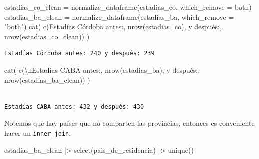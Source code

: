\documentclass[
  spanish,
  letterpaper,
  DIV=11,
  numbers=noendperiod]{scrartcl}
\newenvironment{Shaded}{\begin{snugshade}}{\end{snugshade}}
\newcommand{\AttributeTok}[1]{\textcolor[rgb]{0.40,0.45,0.13}{#1}}
\newcommand{\FunctionTok}[1]{\textcolor[rgb]{0.28,0.35,0.67}{#1}}
\newcommand{\NormalTok}[1]{\textcolor[rgb]{0.00,0.23,0.31}{#1}}
\newcommand{\OtherTok}[1]{\textcolor[rgb]{0.00,0.23,0.31}{#1}}
\newcommand{\SpecialCharTok}[1]{\textcolor[rgb]{0.37,0.37,0.37}{#1}}
\newcommand{\StringTok}[1]{\textcolor[rgb]{0.13,0.47,0.30}{#1}}
\begin{document}
\begin{Shaded}
\begin{Highlighting}[]
\NormalTok{estadias\_co\_clean }\OtherTok{=} \FunctionTok{normalize\_dataframe}\NormalTok{(estadias\_co, }\AttributeTok{which\_remove =} \StringTok{\textquotesingle{}both\textquotesingle{}}\NormalTok{)}
\NormalTok{estadias\_ba\_clean }\OtherTok{=} \FunctionTok{normalize\_dataframe}\NormalTok{(estadias\_ba, }\AttributeTok{which\_remove =} \StringTok{"both"}\NormalTok{)}
\FunctionTok{cat}\NormalTok{(}
  \FunctionTok{c}\NormalTok{(}\StringTok{\textquotesingle{}Estadías Córdoba antes:\textquotesingle{}}\NormalTok{, }\FunctionTok{nrow}\NormalTok{(estadias\_co), }\StringTok{\textquotesingle{}y después:\textquotesingle{}}\NormalTok{, }\FunctionTok{nrow}\NormalTok{(estadias\_co\_clean))}
\NormalTok{)}
\end{Highlighting}
\end{Shaded}

\begin{verbatim}
Estadías Córdoba antes: 240 y después: 239
\end{verbatim}

\begin{Shaded}
\begin{Highlighting}[]
\FunctionTok{cat}\NormalTok{(}
  \FunctionTok{c}\NormalTok{(}\StringTok{\textquotesingle{}}\SpecialCharTok{\textbackslash{}n}\StringTok{Estadías CABA antes:\textquotesingle{}}\NormalTok{, }\FunctionTok{nrow}\NormalTok{(estadias\_ba), }\StringTok{\textquotesingle{}y después:\textquotesingle{}}\NormalTok{, }\FunctionTok{nrow}\NormalTok{(estadias\_ba\_clean))}
\NormalTok{)}
\end{Highlighting}
\end{Shaded}

\begin{verbatim}

Estadías CABA antes: 432 y después: 430
\end{verbatim}

Notemos que hay países que no comparten las provincias, entonces es
conveniente hacer un \texttt{inner\_join}.

\begin{Shaded}
\begin{Highlighting}[]
\NormalTok{estadias\_ba\_clean }\SpecialCharTok{|\textgreater{}} \FunctionTok{select}\NormalTok{(pais\_de\_residencia) }\SpecialCharTok{|\textgreater{}} \FunctionTok{unique}\NormalTok{()}
\end{Highlighting}
\end{Shaded}
\end{document}
